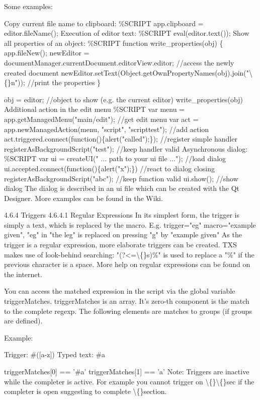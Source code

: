 \documentclass{article}
\begin{document}
	
	Some examples:
	
	Copy current file name to clipboard:
	\%SCRIPT
	app.clipboard = editor.fileName();
	Execution of editor text:
	\%SCRIPT
	eval(editor.text());
	Show all properties of an object:
	\%SCRIPT
	function write\_properties(obj) \{
	app.fileNew();
	newEditor = documentManager.currentDocument.editorView.editor;   //access the newly created document
	newEditor.setText(Object.getOwnPropertyNames(obj).join("\textbackslash\{\}n"));   //print the properties
	\}
	
	obj = editor;                                                        //object to show (e.g. the current editor)
	write\_properties(obj)
	Additional action in the edit menu
	\%SCRIPT
	var menu = app.getManagedMenu("main/edit");                   //get edit menu
	var act = app.newManagedAction(menu, "script", "scripttest"); //add action
	act.triggered.connect(function()\{alert("called");\});          //register simple handler
	registerAsBackgroundScript("test");                           //keep handler valid
	Asynchronous dialog:
	\%SCRIPT
	var ui = createUI(" ... path to your ui file ...");  //load dialog
	ui.accepted.connect(function()\{alert("x");\})         //react to dialog closing
	registerAsBackgroundScript("abc");                   //keep function valid
	ui.show();                                           //show dialog
	The dialog is described in an ui file which can be created with the Qt Designer.
	More examples can be found in the Wiki.
	
	4.6.4 Triggers
	4.6.4.1 Regular Expressions
	In its simplest form, the trigger is simply a text, which is replaced by the macro. E.g. trigger="eg" macro="example given", "eg" in "the leg" is replaced on pressing "g" by "example given"
	As the trigger is a regular expression, more elaborate triggers can be created. TXS makes use of look-behind searching: "(?<=\textbackslash\{\}s)\%" is used to replace a "\%" if the previous character is a space. More help on regular expressions can be found on the internet.
	
	You can access the matched expression in the script via the global variable triggerMatches. triggerMatches is an array. It's zero-th component is the match to the complete regexp. The following elements are matches to groups (if groups are defined).
	
	Example:
	
	Trigger: \#([a-z])
	Typed text: \#a
	
	triggerMatches[0] == '\#a'
	triggerMatches[1] == 'a'
	Note: Triggers are inactive while the completer is active. For example you cannot trigger on \textbackslash\{\}\textbackslash\{\}sec if the completer is open suggesting to complete \textbackslash\{\}section.
	
\end{document}
